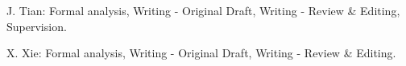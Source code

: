 \documentclass[lineno,pdflatex,sn-mathphys-num]{sn-jnl}%
\theoremstyle{thmstyleone}%
\theoremstyle{thmstyletwo}%
\theoremstyle{thmstylethree}%
\begin{document}
J. Tian: Formal analysis, Writing - Original Draft, Writing - Review \& Editing, Supervision.

X. Xie: Formal analysis, Writing - Original Draft, Writing - Review \& Editing.



\end{document}
